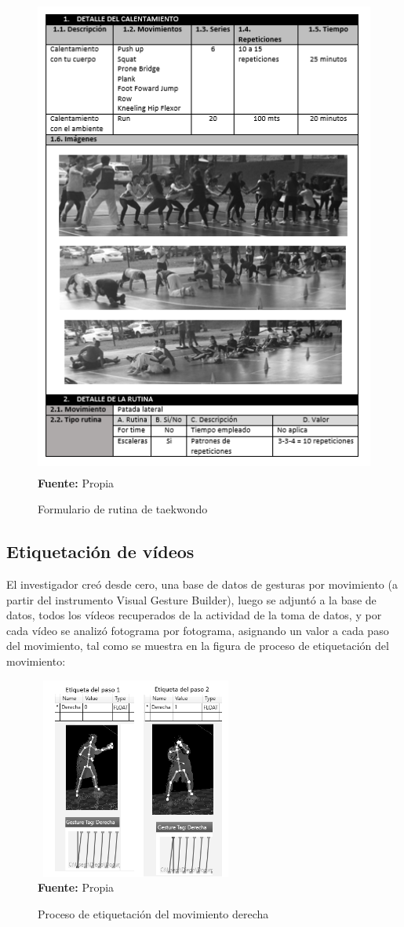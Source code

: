 \begin{figure}[H]
	\caption{Formulario de rutina de taekwondo}
	\label{fig:frmRoutTaek}
	\centering	\includegraphics[width=445px,height=600px]{graphics/resultados/rutina-taekwondo.PNG} \\
	\textbf{Fuente:} Propia
\end{figure}
\subsection{Etiquetaci\'on de v\'ideos}
El investigador cre\'o desde cero, una base de datos de gesturas por movimiento (a partir del instrumento Visual Gesture Builder), luego se adjunt\'o a la base de datos, todos los v\'ideos recuperados de la actividad de la toma de datos, y por cada v\'ideo se analiz\'o fotograma por fotograma, asignando un valor a cada paso del movimiento, tal como se muestra en la figura de proceso de etiquetaci\'on del movimiento:
 \begin{figure}[H]
	\caption{Proceso de etiquetaci\'on del movimiento derecha}
	\label{fig:getTag}
	\centering
	\includegraphics[width=250px,height=250px]{graphics/etiquetas.png} \\
	\textbf{Fuente:} Propia
\end{figure} 
